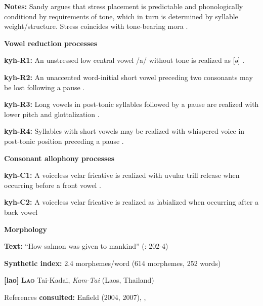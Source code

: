 \textbf{Notes:} Sandy argues that stress placement is predictable and phonologically conditiond by requirements of tone, which in turn is determined by syllable weight/structure. Stress coincides with tone-bearing mora \citep[40]{Sandy2014}.



\textbf{Vowel reduction processes}



\textbf{kyh-R1:} An unstressed low central vowel /a/ without tone is realized as [ə] \citep[11]{Bright1957}.



\textbf{kyh-R2:} An unaccented word-initial short vowel preceding two consonants may be lost following a pause \citep[53]{Bright1957}.



\textbf{kyh-R3:} Long vowels in post-tonic syllables followed by a pause are realized with lower pitch and glottalization \citep[13]{Bright1957}.



\textbf{kyh-R4:} Syllables with short vowels may be realized with whispered voice in post-tonic position preceding a pause \citep[13]{Bright1957}.



\textbf{Consonant allophony processes}



\textbf{kyh-C1:} A voiceless velar fricative is realized with uvular trill release when occurring before a front vowel \citep{Bright1957}.



\textbf{kyh-C2:} A voiceless velar fricative is realized as labialized when occurring after a back vowel \citep[8]{Bright1957}



\textbf{Morphology}



\textbf{Text:} “How salmon was given to mankind” (\citealt{AnguloFreeland1971}: 202-4)



\textbf{Synthetic index:} 2.4 morphemes/word (614 morphemes, 252 words)



\textbf{[lao]}   \textbf{\textsc{Lao}}  Tai-Kadai, \textit{Kam-Tai} (Laos, Thailand)



References \textbf{consulted:} Enfield (2004, 2007), \citet{Erickson2001}, \citet{MorevEtAl1979}



